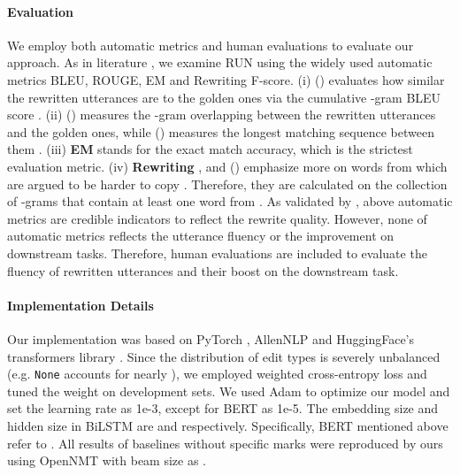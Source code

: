 \documentclass[11pt,a4paper]{article}
\begin{document}
\paragraph{Evaluation} We employ both automatic metrics and human evaluations to evaluate our approach. As in literature \cite{pan-etal-2019-improving}, we examine RUN using the widely used automatic metrics BLEU, ROUGE, EM and Rewriting F-score. (i)  () evaluates how similar the rewritten utterances are to the golden ones via the cumulative -gram BLEU score \cite{papineni-etal-2002-bleu}. (ii)  () measures the -gram overlapping between the rewritten utterances and the golden ones, while  () measures the longest matching sequence between them \cite{lin-2004-rouge}. (iii) \textbf{EM} stands for the exact match accuracy, which is the strictest evaluation metric. (iv) \textbf{Rewriting} ,  and  () emphasize more on words from  which are argued to be harder to copy \cite{pan-etal-2019-improving}. Therefore, they are calculated on the collection of -grams that contain at least one word from . As validated by \citet{pan-etal-2019-improving}, above automatic metrics are credible indicators to reflect the rewrite quality. However, none of automatic metrics reflects the utterance fluency or the improvement on downstream tasks. Therefore, human evaluations are included to evaluate the fluency of rewritten utterances and their boost on the downstream task.


\paragraph{Implementation Details} Our implementation was based on PyTorch \cite{paszke2017automatic}, AllenNLP \cite{gardner-etal-2018-allennlp} and HuggingFace's transformers library \cite{Wolf2019HuggingFacesTS}. Since the distribution of edit types is severely unbalanced (e.g. {\small\texttt{None}} accounts for nearly ), we employed weighted cross-entropy loss and tuned the weight on development sets. We used Adam \cite{adam_kingma_2014} to optimize our model and set the learning rate as 1e-3, except for BERT as 1e-5. The embedding size and hidden size in BiLSTM are  and  respectively.
Specifically, BERT mentioned above refer to . All results of baselines without specific marks were reproduced by ours using OpenNMT with beam size as  \cite{klein-etal-2017-opennmt}.
\end{document}
